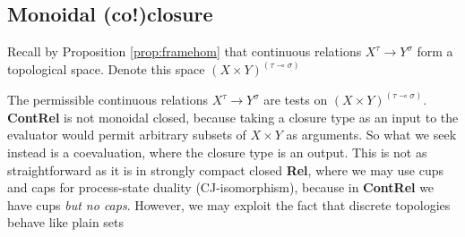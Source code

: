 \subsection{Monoidal (co!)closure}

\begin{defn}
Recall by Proposition \ref{prop:framehom} that continuous relations $X^\tau \rightarrow Y^\sigma$ form a topological space. Denote this space $(X \times Y)^{(\tau \multimap \sigma)}$
\end{defn}

The permissible continuous relations $X^\tau \rightarrow Y^\sigma$ are tests on $(X \times Y)^{(\tau \multimap \sigma)}$. \textbf{ContRel} is not monoidal closed, because taking a closure type as an input to the evaluator would permit arbitrary subsets of $X \times Y$ as arguments. So what we seek instead is a coevaluation, where the closure type is an output. This is not as straightforward as it is in strongly compact closed \textbf{Rel}, where we may use cups and caps for process-state duality (CJ-isomorphism), because in \textbf{ContRel} we have cups \emph{but no caps}. However, we may exploit the fact that discrete topologies behave like plain sets 
